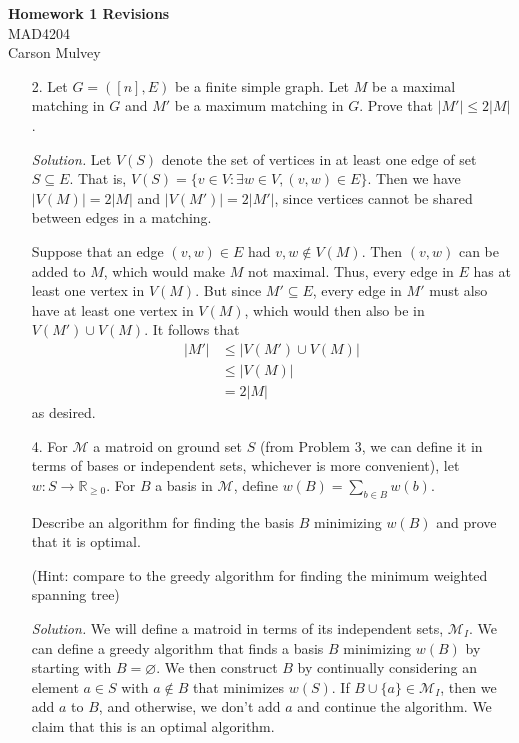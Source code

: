 \documentclass[11pt,letterpaper]{article}
\newenvironment{solution}{\color{blue}\textit{Solution.}}{\color{black}}
\begin{document}
\begin{center}
    \begin{large}
        \textbf{Homework 1 Revisions} \\
        MAD4204 \\
        Carson Mulvey
    \end{large}
\end{center}

\begin{enumerate}
    \item[2.] Let $G = ([n],E)$ be a finite simple graph.
    Let $M$ be a maximal matching in $G$ and $M'$ be a maximum matching in $G$.
    Prove that $|M'| \leq 2 |M|$.

    \begin{solution}
        Let $V(S)$ denote the set of vertices in at least one edge of set $S\subseteq{E}$. That is, $V(S)=\{v\in{V}:\exists {w}\in{V},(v,w)\in{E}\}$. Then we have $|V(M)|=2|M|$ and $|V(M')|=2|M'|$, since vertices cannot be shared between edges in a matching.

        Suppose that an edge $(v,w)\in{E}$ had $v,w\notin{V(M)}$. Then $(v,w)$ can be added to $M$, which would make $M$ not maximal. Thus, every edge in $E$ has at least one vertex in $V(M)$. But since $M'\subseteq{E}$, every edge in $M'$ must also have at least one vertex in $V(M)$, which would then also be in $V(M')\cup{V(M)}$. It follows that
        \begin{align*}
            |M'|&\leq{|V(M')\cup{V(M)}|} \\
            &\leq{|V(M)|} \\
            &=2|M|
        \end{align*}
        as desired. \qedsymbol{}
    \end{solution}
     
    \item[4.] For $\mathcal{M}$ a matroid on ground set $S$ (from Problem 3, we can define it in terms of bases or independent sets, whichever is more convenient), let $w:S \to \mathbb{R}_{\geq 0}$.
    For $B$ a basis in $\mathcal{M}$, define $w(B) = \sum_{b \in B} w(b)$.
    
    Describe an algorithm for finding the basis $B$ minimizing $w(B)$ and prove that it is optimal.
    
    (Hint: compare to the greedy algorithm for finding the minimum weighted spanning tree)
    
    \begin{solution}
        We will define a matroid in terms of its independent sets, $\mathcal{M}_I$. We can define a greedy algorithm that finds a basis $B$ minimizing $w(B)$ by starting with $B=\varnothing $. We then construct $B$ by continually considering an element $a\in{S}$ with $a\notin{B}$ that minimizes $w(S)$. If $B\cup\{a\}\in{\mathcal{M}_I}$, then we add $a$ to $B$, and otherwise, we don't add $a$ and continue the algorithm. We claim that this is an optimal algorithm.


\end{solution}
\end{enumerate}
\end{document}
